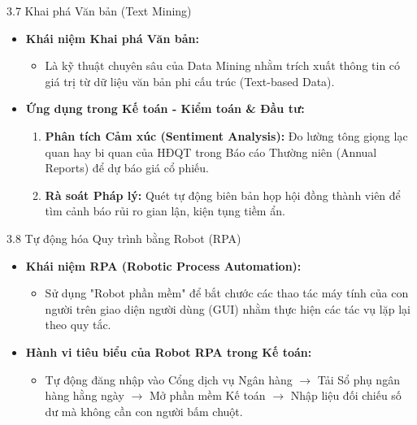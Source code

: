 \documentclass[aspectratio=169]{beamer}
\begin{document}
\begin{frame}{3.7 Khai phá Văn bản (Text Mining)}
    \begin{itemize}
        \item \textbf{Khái niệm Khai phá Văn bản:}
        \begin{itemize}
            \item Là kỹ thuật chuyên sâu của Data Mining nhằm trích xuất thông tin có giá trị từ dữ liệu văn bản phi cấu trúc (Text-based Data).
        \end{itemize}
        \item \textbf{Ứng dụng trong Kế toán - Kiểm toán \& Đầu tư:}
        \begin{enumerate}
            \item \textbf{Phân tích Cảm xúc (Sentiment Analysis):} Đo lường tông giọng lạc quan hay bi quan của HĐQT trong Báo cáo Thường niên (Annual Reports) để dự báo giá cổ phiếu.
            \item \textbf{Rà soát Pháp lý:} Quét tự động biên bản họp hội đồng thành viên để tìm cảnh báo rủi ro gian lận, kiện tụng tiềm ẩn.
        \end{enumerate}
    \end{itemize}
\end{frame}

\begin{frame}{3.8 Tự động hóa Quy trình bằng Robot (RPA)}
    \begin{itemize}
        \item \textbf{Khái niệm RPA (Robotic Process Automation):}
        \begin{itemize}
            \item Sử dụng "Robot phần mềm" để bắt chước các thao tác máy tính của con người trên giao diện người dùng (GUI) nhằm thực hiện các tác vụ lặp lại theo quy tắc.
        \end{itemize}
        \item \textbf{Hành vi tiêu biểu của Robot RPA trong Kế toán:}
        \begin{itemize}
            \item Tự động đăng nhập vào Cổng dịch vụ Ngân hàng $\rightarrow$ Tải Sổ phụ ngân hàng hằng ngày $\rightarrow$ Mở phần mềm Kế toán $\rightarrow$ Nhập liệu đối chiếu số dư mà không cần con người bấm chuột.
        \end{itemize}
    \end{itemize}
\end{frame}
\end{document}
